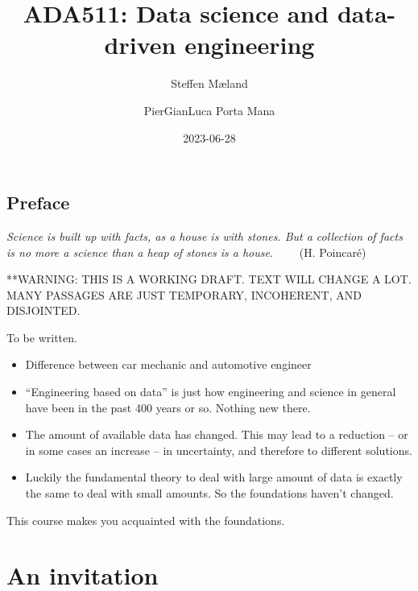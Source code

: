 \documentclass[
  a4paper,
  DIV=11,
  numbers=noendperiod,
  oneside]{scrreprt}
\title{ADA511: Data science and data-driven engineering}
\author{Steffen Mæland \and PierGianLuca Porta Mana}
\date{2023-06-28}
\renewcommand*\contentsname{Table of contents}
\newcommand\contentsname{Table of contents}
\begin{document}
\maketitle
\ifdefined\Shaded\renewenvironment{Shaded}{\begin{tcolorbox}[boxrule=0pt, frame hidden, enhanced, borderline west={3pt}{0pt}{shadecolor}, breakable, interior hidden, sharp corners]}{\end{tcolorbox}}\fi

\renewcommand*\contentsname{Table of contents}
{
\hypersetup{linkcolor=}
\setcounter{tocdepth}{2}
\tableofcontents
}

\hypertarget{preface}{%
\chapter*{Preface}\label{preface}}


\hfill\break
\hfill\break
\hfill\break
\hfill\break
\hfill\break
\hfill\break

\emph{Science is built up with facts, as a house is with stones. But a
collection of facts is no more a science than a heap of stones is a
house.} ~~~~{(H. Poincaré)}

**WARNING: THIS IS A WORKING DRAFT. TEXT WILL CHANGE A LOT. MANY
PASSAGES ARE JUST TEMPORARY, INCOHERENT, AND DISJOINTED.

To be written.

\begin{itemize}
\item
  Difference between car mechanic and automotive engineer
\item
  ``Engineering based on data'' is just how engineering and science in
  general have been in the past 400 years or so. Nothing new there.
\item
  The amount of available data has changed. This may lead to a reduction
  -- or in some cases an increase -- in uncertainty, and therefore to
  different solutions.
\item
  Luckily the fundamental theory to deal with large amount of data is
  exactly the same to deal with small amounts. So the foundations
  haven't changed.
\end{itemize}

This course makes you acquainted with the foundations.

\part{An invitation}
\end{document}
